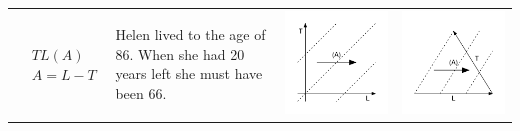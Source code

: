 \documentclass[11pt,oneside,a4paper]{article} %
\begin{document}
\begin{center}
\begin{longtable}{m{}m{}m{}m{}}
  \midrule
  $$\begin{aligned}
    &TL(A) \\
    &A = L - T
  \end{aligned}$$ &
  Helen lived to the age of 86. When she had 20 years left she must have been
  66. & \includegraphics[width = \linewidth]{Figures/JonasTable/TLa.pdf} &
  \includegraphics[width = \linewidth]{Figures/JonasTable/TLa_iso.pdf}  \\

\end{longtable}
\end{center}
\end{document}
